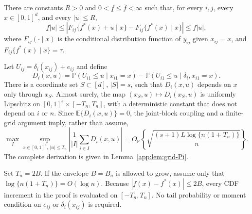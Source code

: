 \documentclass[twoside,11pt]{article}
\newenvironment{revision}{\color{revisionred}}{}
\begin{document}
\begin{assumption}\label{assumptionA}
\begin{revision}
There are constants $R>0$ and $0<\underline f\le\overline f<\infty$ such that, for every $i,j$, every $x\in[0,1]^d$, and every $|u|\le R$,
\begin{equation}
 \underline f|u|
 \le\left|F_{ij}\{f^*(x)+u\mid x\}-F_{ij}\{f^*(x)\mid x\}\right|
 \le\overline f|u|,                                          \label{eq:curvature_full}
\end{equation}
where $F_{ij}(\cdot\mid x)$ is the conditional distribution function of $y_{ij}$ given $x_{ij}=x$, and $F_{ij}\{f^*(x)\mid x\}=\tau$.
\end{revision}
\end{assumption}

\begin{assumption}\label{assump:lip}
\begin{revision}
Let $U_{ij}=\delta_i(x_{ij})+e_{ij}$ and define
\begin{equation}
 D_i(x,u)=\mathbb P(U_{i1}\le u\mid x_{i1}=x)
 -\mathbb P(U_{i1}\le u\mid\delta_i,x_{i1}=x).               \label{pi_def_assump}
\end{equation}
There is a coordinate set $S\subset[d]$, $|S|=s$, such that $D_i(x,u)$ depends on $x$ only through $x_S$. Almost surely, the map $(x_S,u)\mapsto D_i(x_S,u)$ is uniformly Lipschitz on $[0,1]^s\times[-T_n,T_n]$, with a deterministic constant that does not depend on $i$ or $n$. Since $\mathbb E\{D_i(x,u)\}=0$, the joint-block coupling and a finite-grid argument imply, rather than assume,
\begin{equation}
 \max_I\sup_{x\in[0,1]^d,\ |u|\le T_n}
 \left|\frac1{|I|}\sum_{i\in I}D_i(x,u)\right|
 =O_{\mathbb P}\left\{\sqrt{\frac{(s+1)L\log\{n(1+T_n)\}}{n}}\right\}. \label{lip_for_Pi}
\end{equation}
The complete derivation is given in Lemma~\ref{app:lem:grid-Pi}.
\end{revision}
\end{assumption}

\begin{assumption}\label{ass:tail_multi_d}
\begin{revision}
Set $T_n=2B$. If the envelope $B=B_n$ is allowed to grow, assume only that $\log\{n(1+T_n)\}=O(\log n)$. Because $|f(x)-f^*(x)|\le2B$, every CDF increment in the proof is evaluated on $[-T_n,T_n]$. No tail probability or moment condition on $e_{ij}$ or $\delta_i(x_{ij})$ is required.
\end{revision}
\end{assumption}
\end{document}
